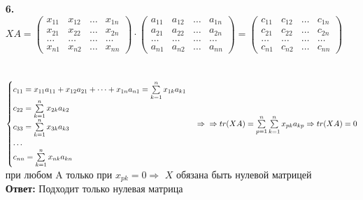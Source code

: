 \documentclass[a4paper]{article}
\newcommand{\mat}[1]{\begin{pmatrix} #1 \end{pmatrix}}
\newcommand{\s}[2]{\sum\limits_{#1}^{#2}}
\renewcommand{\r}{\Rightarrow}
\begin{document}
\begin{enumerate}
    \item[\textbf{6.}]\indent \\
    $XA = \mat{x_{11} & x_{12} & \dots & x_{1n} \\ x_{21} & x_{22} & \dots & x_{2n} \\ \dots & \dots & \dots & \dots \\ x_{n1} & x_{n2} & \dots & x_{nn}} \cdot \mat{a_{11} & a_{12} & \dots & a_{1n} \\ a_{21} & a_{22} & \dots & a_{2n} \\ \dots & \dots & \dots & \dots \\ a_{n1} & a_{n2} & \dots & a_{nn}} = \mat{c_{11} & c_{12} & \dots & c_{1n} \\ c_{21} & c_{22} & \dots & c_{2n} \\ \dots & \dots & \dots & \dots \\ c_{n1} & c_{n2} & \dots & c_{nn}}$\\\\\\
    $\begin{cases}
        c_{11} = x_{11}a_{11}+x_{12}a_{21} + \dots + x_{1n}a_{n1} = \s{k=1}{n} x_{1k}a_{k1}\\
        c_{22} = \s{k=1}{n} x_{2k}a_{k2}\\
        c_{33} = \s{k=1}{n} x_{3k}a_{k3}\\
        \dots \\ 
        c_{nn} = \s{k=1}{n} x_{nk}a_{kn}
    \end{cases} \r \\\\\\ \r tr(XA) = \s{p=1}{n}\s{k=1}{n}x_{pk}a_{kp} \r tr(XA) = 0$ при любом A только при $x_{pk}=0 \r$ $X$ обязана быть нулевой матрицей\\
    \textbf{Ответ: } Подходит только нулевая матрица


\end{enumerate}
\end{document}
